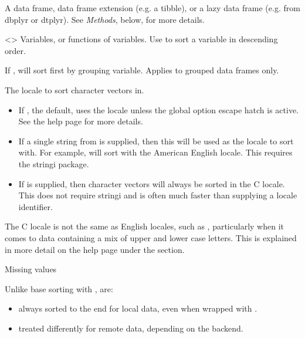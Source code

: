\documentclass[a4paper]{book}
\begin{document}
%
\begin{Arguments}
\begin{ldescription}
\item[\code{.data}] A data frame, data frame extension (e.g. a tibble), or a
lazy data frame (e.g. from dbplyr or dtplyr). See \emph{Methods}, below, for
more details.

\item[\code{...}] <> Variables, or
functions of variables. Use  to sort a variable in descending
order.

\item[\code{.by\_group}] If , will sort first by grouping variable. Applies to
grouped data frames only.

\item[\code{.locale}] The locale to sort character vectors in.
\begin{itemize}

\item{} If , the default, uses the  locale unless the
 global option escape hatch is active. See the
 help page for more details.
\item{} If a single string from  is supplied, then
this will be used as the locale to sort with. For example,  will
sort with the American English locale. This requires the stringi package.
\item{} If  is supplied, then character vectors will always be sorted in the
C locale. This does not require stringi and is often much faster than
supplying a locale identifier.

\end{itemize}


The C locale is not the same as English locales, such as ,
particularly when it comes to data containing a mix of upper and lower case
letters. This is explained in more detail on the 
help page under the  section.
\end{ldescription}
\end{Arguments}
%
\begin{Details}
%
\begin{SubSection}{Missing values}

Unlike base sorting with ,  are:
\begin{itemize}

\item{} always sorted to the end for local data, even when wrapped with .
\item{} treated differently for remote data, depending on the backend.

\end{itemize}

\end{SubSection}

\end{Details}
\end{document}
